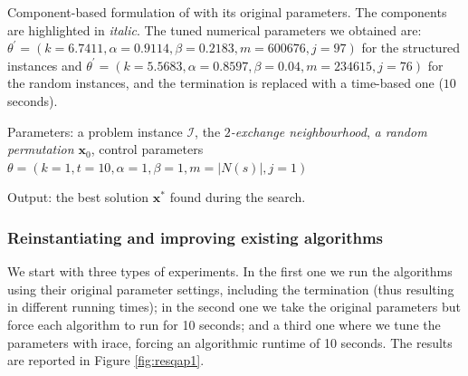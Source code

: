 \begin{algorithm}[ht!]
	  \caption{Component-based formulation of \qsa with its original parameters. 
	  The components are highlighted in \textit{italic}. The 
      tuned numerical parameters we obtained are: $\theta^\prime = (k = 6.7411, 
      \alpha = 0.9114, \beta = 0.2183, m = 600676, j = 97)$ for the structured instances and 
      $\theta^\prime = (k = 5.5683, \alpha = 0.8597, \beta = 0.04, m = 234615, j = 76)$ 
      for the random instances, and the termination is replaced with a time-based one ($10$ seconds).}
     \label{algo:qsa}
    
    Parameters: a problem instance $\mathcal{I}$, the \textit{$2$-exchange neighbourhood}, 
    \textit{a random permutation $\mathbf{x}_0$}, control parameters 
    $\theta = (k = 1, t = 10, \alpha = 1, \beta = 1, m = |N(s)|, j = 1)$
    
    Output: the best solution $\mathbf{x^*}$ found during the search.
    
	\begin{algorithmic}[1] 
		\ENDIF
		\ENDIF
		\ENDIF
		\ENDWHILE
	\end{algorithmic}
	
\end{algorithm}

\subsubsection{Reinstantiating and improving existing algorithms} 
We start with three types of experiments.
In the first one we run the algorithms using their original parameter settings, including the
termination (thus resulting in different running times);
in the second one we take the original parameters but force each algorithm to run for 10 seconds; and a third one where we tune the parameters with irace, forcing an algorithmic runtime of 10 seconds. 
The results are reported in Figure \ref{fig:resqap1}.

